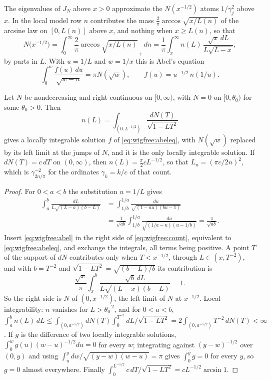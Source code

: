 The eigenvalues of $J_N$ above $x>0$ approximate the $N(x^{-1/2})$ atoms $1/\gamma_j^2$ above $x$. In the local model row $n$ contributes the mass $\frac2\pi\arccos\sqrt{x/L(n)}$ of the arcsine law on $[0,L(n)]$ above $x$, and nothing when $x\ge L(n)$, so that
\begin{equation}\label{eq:wigfree:count}
N\big(x^{-1/2}\big)=\int_0^\infty\frac2\pi\arccos\sqrt{x/L(n)}_{\,+}\,dn=\frac1\pi\int_x^\infty n(L)\,\frac{\sqrt x\,dL}{L\sqrt{L-x}},
\end{equation}
by parts in $L$. With $u=1/L$ and $w=1/x$ this is Abel's equation
\begin{equation}\label{eq:wigfree:abeleq}
\int_0^w\frac{f(u)\,du}{\sqrt{w-u}}=\pi N(\sqrt w),\qquad f(u)=u^{-1/2}\,n(1/u).
\end{equation}

\begin{proposition}\label{prop:wigfree:abel}
Let $N$ be nondecreasing and right continuous on $[0,\infty)$, with $N=0$ on $[0,\theta_0)$ for some $\theta_0>0$. Then
\begin{equation}\label{eq:wigfree:abel}
n(L)=\int_{(0,L^{-1/2})}\frac{dN(T)}{\sqrt{1-LT^2}}
\end{equation}
gives a locally integrable solution $f$ of \eqref{eq:wigfree:abeleq}, with $N(\sqrt w)$ replaced by its left limit at the jumps of $N$, and it is the only locally integrable solution. If $dN(T)=c\,dT$ on $(0,\infty)$, then $n(L)=\frac\pi2cL^{-1/2}$, so that $L_n=(\pi c/2n)^2$, which is $\gamma_{2n/\pi}^{-2}$ for the ordinates $\gamma_k=k/c$ of that count.
\end{proposition}

\begin{proof}
For $0<a<b$ the substitution $u=1/L$ gives
\begin{align*}
\int_a^b\frac{dL}{L\sqrt{(L-a)(b-L)}}&=\int_{1/b}^{1/a}\frac{du}{\sqrt{(1-au)(bu-1)}}\\
&=\frac1{\sqrt{ab}}\int_{1/b}^{1/a}\frac{du}{\sqrt{(1/a-u)(u-1/b)}}=\frac\pi{\sqrt{ab}} .
\end{align*}
Insert \eqref{eq:wigfree:abel} in the right side of \eqref{eq:wigfree:count}, equivalent to \eqref{eq:wigfree:abeleq}, and exchange the integrals, all terms being positive. A point $T$ of the support of $dN$ contributes only when $T<x^{-1/2}$, through $L\in(x,T^{-2})$, and with $b=T^{-2}$ and $\sqrt{1-LT^2}=\sqrt{(b-L)/b}$ its contribution is
\[
\frac{\sqrt x}\pi\int_x^b\frac{\sqrt b\,dL}{L\sqrt{(L-x)(b-L)}}=1 .
\]
So the right side is $N$ of $(0,x^{-1/2})$, the left limit of $N$ at $x^{-1/2}$. Local integrability: $n$ vanishes for $L>\theta_0^{-2}$, and for $0<a<b$, $\int_a^bn(L)\,dL\le\int_{(0,a^{-1/2})}dN(T)\int_0^{T^{-2}}dL/\sqrt{1-LT^2}=2\int_{(0,a^{-1/2})}T^{-2}\,dN(T)<\infty$. If $g$ is the difference of two locally integrable solutions, $\int_0^wg(u)(w-u)^{-1/2}du=0$ for every $w$; integrating against $(y-w)^{-1/2}$ over $(0,y)$ and using $\int_u^y dw/\sqrt{(y-w)(w-u)}=\pi$ gives $\int_0^yg=0$ for every $y$, so $g=0$ almost everywhere. Finally $\int_0^{L^{-1/2}}c\,dT/\sqrt{1-LT^2}=cL^{-1/2}\arcsin1$.
\end{proof}

